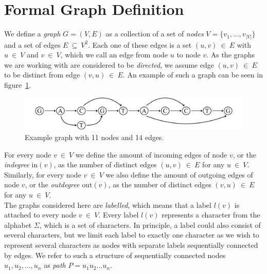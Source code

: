 \documentclass[a4paper,12pt,twoside,BCOR=10mm]{scrbook}
\begin{document}
\section{Formal Graph Definition}
\label{sec:graph_definition}
%
We define a \textit{graph} $ G = (V, E) $ as a collection of a set 
of \textit{nodes} $ V = \{ v_1, ..., v_{|V|} \} $ and a set of edges $ E {\: \subseteq \:} V^2 $. 
Each one of these edges is a set $ (u, v) {\: \in \:} E $ with $ u {\: \in \:} V $ and $ v {\: \in \:} V $, 
which we call an edge from node $ u $ to node $ v $. 
As the graphs we are working with are considered to be \textit{directed}, 
we assume edge $ (u, v) {\: \in \:} E $ to 
be distinct from edge $ (v, u) {\: \in \:} E $. 
An example of such a graph can be seen in figure~\ref{fig:evo_fig_graph_example}. \\
\begin{figure}[!htb]
\centering
\includegraphics[width=\textwidth]{evo_fig_graph_example.pdf}
\caption[Example graph]{Example graph with 11 nodes and 14 edges.} \label{fig:evo_fig_graph_example}
\end{figure}
For every node $ v {\: \in \:} V $ we define the amount of incoming edges of 
node $ v $, or the \textit{indegree} $ \textrm{in} ( v ) $, as the number of 
distinct edges $ (u, v) {\: \in \:} E $ for any $ u {\: \in \:} V $. 
Similarly, for every node $ v {\: \in \:} V $ we also define the amount of outgoing edges of 
node $ v $, or the \textit{outdegree} $ \textrm{out} ( v ) $, as the number of 
distinct edges $ (v, u) {\: \in \:} E $ for any $ u {\: \in \:} V $. \\
The graphs considered here are \textit{labelled}, which means that a label $ l( v ) $ is attached 
to every node $ v {\: \in \:} V $. 
Every label $ l( v ) $ represents a character 
from the alphabet $ \Sigma $, which is a set of characters. 
In principle, a label could also consist of several characters, 
but we limit each label to exactly one character as we wish to 
represent several characters as nodes with separate labels sequentially connected by edges. 
We refer to such a structure of sequentially connected 
nodes $ u_1, u_2, ..., u_n $ as \textit{path} $ P = u_1 u_2 ... u_n $.
\end{document}
